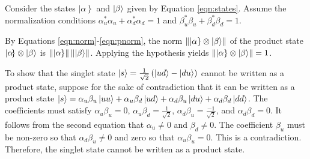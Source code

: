 \begin{answer}
	Consider the states $\left|\alpha\right\}$ and $\ket{\beta}$ given by Equation \eqref{eqn:states}.
	Assume the normalization conditions $\alpha_u^* \alpha_u + \alpha_d^* \alpha_d = 1$ and $\beta_u^* \beta_u + \beta_d^* \beta_d = 1$.

	By Equations \eqref{eqn:norm}-\eqref{eqn:pnorm}, the norm $\left\||\alpha\} \otimes \ket{\beta}\right\|$ of the product state $\left|\alpha\!\right\} \otimes \ket{\beta}$ is $\left\||\alpha\}\right\| \left\|\ket{\beta}\right\|$.
	Applying the hypothesis yields $\left\||\alpha\} \otimes \ket{\beta}\right\| = 1$.
\end{answer}

\begin{answer}[Singlet]
	To show that the singlet state $\ket{s} = \frac{1}{\sqrt{2}} \left(\ket{u d} - \ket{d u}\right)$ cannot be written as a product state, suppose for the sake of contradiction that it can be written as a product state $\ket{s} = \alpha_u \beta_u \ket{u u} + \alpha_u \beta_d \ket{u d} + \alpha_d \beta_u \ket{d u} + \alpha_d \beta_d \ket{d d}$.
	The coefficients must satisfy $\alpha_u \beta_u = 0$, $\alpha_u \beta_d = \frac{1}{\sqrt{2}}$, $\alpha_d \beta_u = \frac{-1}{\sqrt{2}}$, and $\alpha_d \beta_d = 0$.
	It follows from the second equation that $\alpha_u \neq 0$ and $\beta_d \neq 0$.
	The coefficient $\beta_u$ must be non-zero so that $\alpha_d \beta_u \neq 0$ and zero so that $\alpha_u \beta_u = 0$.
	This is a contradiction.
	Therefore, the singlet state cannot be written as a product state.
\end{answer}

